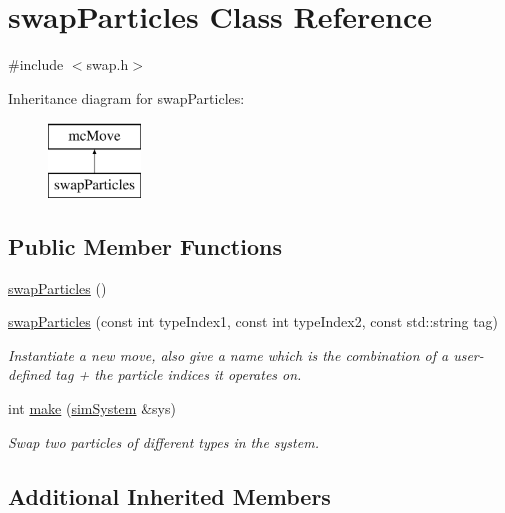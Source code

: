 \hypertarget{classswap_particles}{\section{swap\-Particles Class Reference}
\label{classswap_particles}
}


{\ttfamily \#include $<$swap.\-h$>$}

Inheritance diagram for swap\-Particles\-:\begin{figure}[H]
\begin{center}
\leavevmode
\includegraphics[height=2.000000cm]{classswap_particles}
\end{center}
\end{figure}
\subsection*{Public Member Functions}
\begin{DoxyCompactItemize}
\item 
\hyperlink{classswap_particles_a1c476913d5b129db6daf5a1a1a5dd209}{swap\-Particles} ()
\item 
\hyperlink{classswap_particles_aac7a7fb48c4ffd3809221fac7a7800a5}{swap\-Particles} (const int type\-Index1, const int type\-Index2, const std\-::string tag)
\begin{DoxyCompactList}\small\item\em Instantiate a new move, also give a name which is the combination of a user-\/defined tag + the particle indices it operates on. \end{DoxyCompactList}\item 
int \hyperlink{classswap_particles_ad8ca574f8e5308b6f0a5f3c7c2799209}{make} (\hyperlink{classsim_system}{sim\-System} \&sys)
\begin{DoxyCompactList}\small\item\em Swap two particles of different types in the system. \end{DoxyCompactList}\end{DoxyCompactItemize}
\subsection*{Additional Inherited Members}


